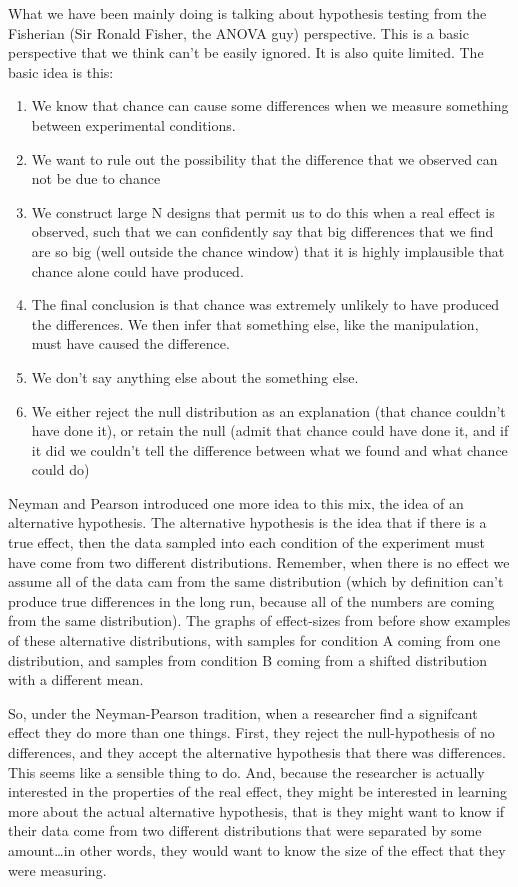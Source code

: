 \documentclass[
]{book}
\providecommand{\tightlist}{%
  \setlength{\itemsep}{0pt}\setlength{\parskip}{0pt}}
\begin{document}
What we have been mainly doing is talking about hypothesis testing from the Fisherian (Sir Ronald Fisher, the ANOVA guy) perspective. This is a basic perspective that we think can't be easily ignored. It is also quite limited. The basic idea is this:

\begin{enumerate}
\def\labelenumi{\arabic{enumi}.}
\tightlist
\item
  We know that chance can cause some differences when we measure something between experimental conditions.
\item
  We want to rule out the possibility that the difference that we observed can not be due to chance
\item
  We construct large N designs that permit us to do this when a real effect is observed, such that we can confidently say that big differences that we find are so big (well outside the chance window) that it is highly implausible that chance alone could have produced.
\item
  The final conclusion is that chance was extremely unlikely to have produced the differences. We then infer that something else, like the manipulation, must have caused the difference.
\item
  We don't say anything else about the something else.
\item
  We either reject the null distribution as an explanation (that chance couldn't have done it), or retain the null (admit that chance could have done it, and if it did we couldn't tell the difference between what we found and what chance could do)
\end{enumerate}

Neyman and Pearson introduced one more idea to this mix, the idea of an alternative hypothesis. The alternative hypothesis is the idea that if there is a true effect, then the data sampled into each condition of the experiment must have come from two different distributions. Remember, when there is no effect we assume all of the data cam from the same distribution (which by definition can't produce true differences in the long run, because all of the numbers are coming from the same distribution). The graphs of effect-sizes from before show examples of these alternative distributions, with samples for condition A coming from one distribution, and samples from condition B coming from a shifted distribution with a different mean.

So, under the Neyman-Pearson tradition, when a researcher find a signifcant effect they do more than one things. First, they reject the null-hypothesis of no differences, and they accept the alternative hypothesis that there was differences. This seems like a sensible thing to do. And, because the researcher is actually interested in the properties of the real effect, they might be interested in learning more about the actual alternative hypothesis, that is they might want to know if their data come from two different distributions that were separated by some amount\ldots in other words, they would want to know the size of the effect that they were measuring.
\end{document}

